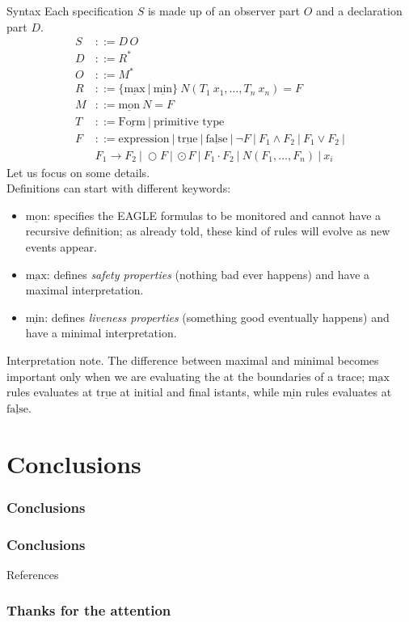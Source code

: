 \documentclass[aspectratio=169,t,xcolor=table]{beamer}
\begin{document}
\begin{frame}[allowframebreaks]{Syntax}
    Each specification $S$ is made up of an observer part $O$ and a declaration part $D$.
    \begin{align*}
    S &::= D \, O \\
    D &::= R^* \\
    O &::= M^* \\
    R &::= \{\underline{\text{max}}\ |\ \underline{\text{min}} \}\ N(T_1\ x_1, \ldots, T_n\ x_n) = F \\
    M &::= \underline{\text{mon}}\ N = F \\
    T &::= \underline{\text{Form}}\ |\ \text{primitive type} \\
    F &::= \text{expression}\ |\ \underline{\text{true}}\ |\ \underline{\text{false}}\ |\ \neg F\ |\ F_1 \land F_2\ |\ F_1 \lor F_2\ |\\
            &F_1 \rightarrow F_2\ |\ \bigcirc F\ |\ \odot F\ |\ F_1 \cdot F_2\ |\ N(F_1, \ldots, F_n)\ |\ x_i
    \end{align*}
    Let us focus on some details.\\
    Definitions can start with different keywords:
    \begin{itemize}
        \item $\underline{\text{mon}}$: specifies the EAGLE formulas to be monitored and cannot have a recursive definition; as already told, these kind of rules will evolve as new events appear.
        \item $\underline{\text{max}}$: defines \textit{safety properties} (nothing bad ever happens) and have a maximal interpretation.
        \item $\underline{\text{min}}$: defines \textit{liveness properties} (something good eventually happens) and have a minimal interpretation.
    \end{itemize}

    \begin{block}{Interpretation note.}    
        The difference between maximal and minimal becomes important only when we are evaluating the at the boundaries of a trace; $\underline{\text{max}}$ rules evaluates at $\underline{\text{true}}$ at initial and final istants, while $\underline{\text{min}}$ rules evaluates at $\underline{\text{false}}$.
    \end{block}    
    

\end{frame}


\section{Conclusions}
\begin{frame}{}
    \frametitle{Conclusions}
\end{frame}


\begin{frame}
    \frametitle{Conclusions}

\end{frame}

\begin{frame}[allowframebreaks]{References}
    \nocite{*} 
    \printbibliography
\end{frame}

\begin{frame}{}
    \frametitle{Thanks for the attention}
\end{frame}
\end{document}
